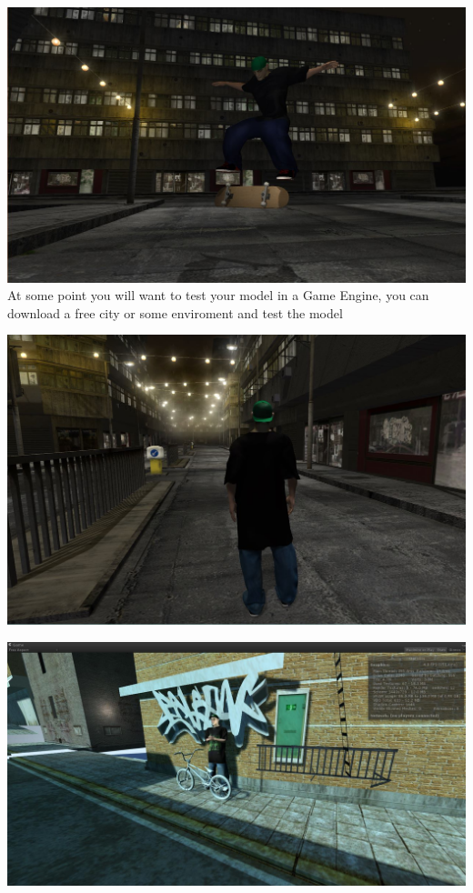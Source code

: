 \documentclass{article}
\begin{document}
  \includegraphics[width=\textwidth]{20.jpg}
  At some point you will want to test your model in a Game Engine, you can download a free city or some enviroment and test the model

  \includegraphics[width=\textwidth]{21.jpg}
  
  \includegraphics[width=\textwidth]{27.jpg}
\end{document}
